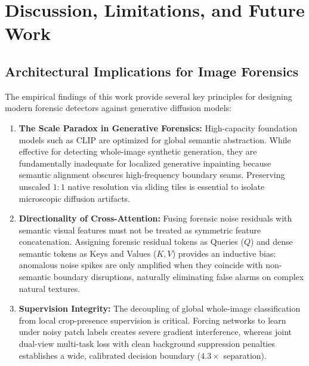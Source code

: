 




\section{Discussion, Limitations, and Future Work}
\label{sec:discussion}

\subsection{Architectural Implications for Image Forensics}
The empirical findings of this work provide several key principles for designing modern forensic detectors against generative diffusion models:
\begin{enumerate}
    \item \textbf{The Scale Paradox in Generative Forensics:} High-capacity foundation models such as CLIP are optimized for global semantic abstraction. While effective for detecting whole-image synthetic generation, they are fundamentally inadequate for localized generative inpainting because semantic alignment obscures high-frequency boundary seams. Preserving unscaled $1:1$ native resolution via sliding tiles is essential to isolate microscopic diffusion artifacts.
    \item \textbf{Directionality of Cross-Attention:} Fusing forensic noise residuals with semantic visual features must not be treated as symmetric feature concatenation. Assigning forensic residual tokens as Queries ($Q$) and dense semantic tokens as Keys and Values ($K, V$) provides an inductive bias: anomalous noise spikes are only amplified when they coincide with non-semantic boundary disruptions, naturally eliminating false alarms on complex natural textures.
    \item \textbf{Supervision Integrity:} The decoupling of global whole-image classification from local crop-presence supervision is critical. Forcing networks to learn under noisy patch labels creates severe gradient interference, whereas joint dual-view multi-task loss with clean background suppression penalties establishes a wide, calibrated decision boundary ($4.3\times$ separation).
\end{enumerate}

